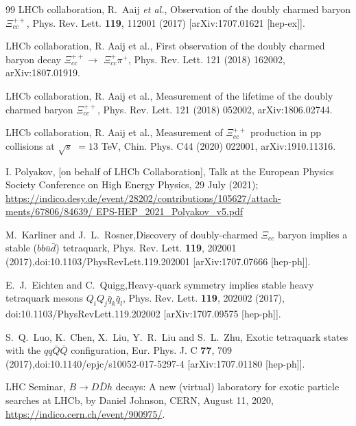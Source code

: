 \documentclass[12pt,onecolumn,floatfix,nofootinbib]{revtex4}
\begin{document}
\begin{thebibliography}{99}
 LHCb collaboration, R.~Aaij \textit{et al.},
Observation of the doubly charmed baryon $\Xi _{cc}^{++}$, Phys. Rev. Lett.
\textbf{119}, 112001 (2017) [arXiv:1707.01621 [hep-ex]].

 LHCb collaboration, R. Aaij et al., First observation
of the doubly charmed baryon decay $\Xi _{cc}^{++}\rightarrow $ $\Xi
_{cc}^{+}\pi ^{+}$, Phys. Rev. Lett. 121 (2018) 162002, arXiv:1807.01919.

 LHCb collaboration, R. Aaij et al., Measurement of
the lifetime of the doubly charmed baryon $\Xi _{cc}^{++}$, Phys. Rev. Lett.
121 (2018) 052002, arXiv:1806.02744.

 LHCb collaboration, R. Aaij et al., Measurement of $%
\Xi _{cc}^{++}$ production in pp collisions at $\sqrt{s}$ $=13$ TeV, Chin.
Phys. C44 (2020) 022001, arXiv:1910.11316.

 I. Polyakov, [on behalf of LHCb Collaboration], Talk
at the European Physics Society Conference on High Energy Physics, 29 July
(2021); 
\href{https://indico.desy.de/event/28202/contributions/105627/attachments/%
67806/84639/ EPS-HEP\_2021\_Polyakov\_v5.pdf}
{https://indico.desy.de/event/28202/contributions/105627/attach-%
ments/67806/84639/ EPS-HEP\_2021\_Polyakov\_v5.pdf}

 M.~Karliner and J.~L.~Rosner,Discovery of
doubly-charmed $\Xi_{cc}$ baryon implies a stable ($b b \bar{u} \bar{d}$)
tetraquark, Phys. Rev. Lett. \textbf{119}, 202001
(2017),doi:10.1103/PhysRevLett.119.202001 [arXiv:1707.07666 [hep-ph]].

 E.~J.~Eichten and C.~Quigg,Heavy-quark symmetry
implies stable heavy tetraquark mesons $Q_iQ_j \bar q_k \bar q_l$, Phys.
Rev. Lett. \textbf{119}, 202002 (2017), doi:10.1103/PhysRevLett.119.202002
[arXiv:1707.09575 [hep-ph]].

 S.~Q.~Luo, K.~Chen, X.~Liu, Y.~R.~Liu and S.~L.~Zhu,
Exotic tetraquark states with the $qq\bar{Q}\bar{Q}$ configuration, Eur.
Phys. J. C \textbf{77}, 709 (2017),doi:10.1140/epjc/s10052-017-5297-4
[arXiv:1707.01180 [hep-ph]].

 LHC Seminar, $B\to D\bar{D}h$ decays: A new (virtual)
laboratory for exotic particle searches at LHCb, by Daniel Johnson, CERN,
August 11, 2020, \href{https://indico.cern.ch/event/900975/}{%
https://indico.cern.ch/event/900975/}.


\end{thebibliography}
\end{document}
